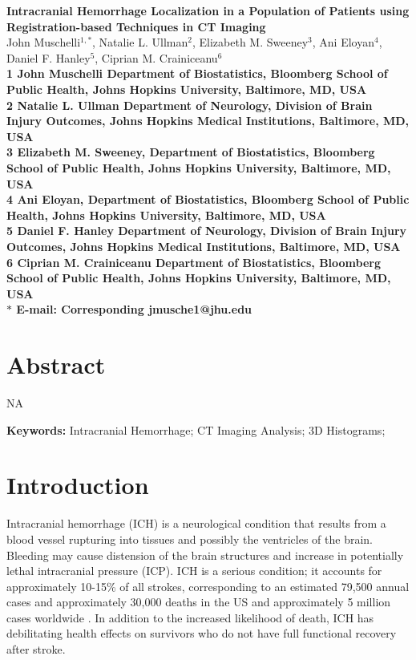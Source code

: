 \documentclass[10pt]{article}\usepackage[]{graphicx}\usepackage[]{color}
\date{}
\begin{document}
\begin{flushleft}
{\Large
\textbf{Intracranial Hemorrhage Localization in a Population of Patients using Registration-based Techniques in CT Imaging}
}
\\
John Muschelli$^{1,\ast}$,  
Natalie L. Ullman$^{2}$,
Elizabeth M. Sweeney$^{3}$,
Ani Eloyan$^{4}$,
Daniel F. Hanley$^{5}$,
Ciprian M. Crainiceanu$^{6}$
\\
\bf{1} John Muschelli Department of Biostatistics, Bloomberg School of Public Health, Johns Hopkins University, Baltimore, MD, USA
\\
\bf{2} Natalie L. Ullman Department of Neurology, Division of Brain Injury Outcomes,  Johns Hopkins Medical Institutions, Baltimore, MD, USA
\\
\bf{3} Elizabeth M. Sweeney, Department of Biostatistics, Bloomberg School of Public Health, Johns Hopkins University, Baltimore, MD, USA
\\
\bf{4} Ani Eloyan, Department of Biostatistics, Bloomberg School of Public Health, Johns Hopkins University, Baltimore, MD, USA
\\
\bf{5} Daniel F. Hanley Department of Neurology, Division of Brain Injury Outcomes,  Johns Hopkins Medical Institutions, Baltimore, MD, USA
\\
\bf{6} Ciprian M. Crainiceanu Department of Biostatistics, Bloomberg School of Public Health, Johns Hopkins University, Baltimore, MD, USA
\\
$\ast$ E-mail: Corresponding jmusche1@jhu.edu
\end{flushleft}


\section*{Abstract}

NA

{\bf Keywords:} Intracranial Hemorrhage; CT Imaging Analysis; 3D Histograms;










\section{Introduction}

Intracranial hemorrhage (ICH) is a neurological condition that results from a blood vessel rupturing into tissues and possibly the ventricles of the brain.  Bleeding may cause distension of the brain structures and increase in potentially lethal intracranial pressure (ICP).  ICH is a serious condition; it accounts for approximately 10-15\% of all strokes, corresponding to an estimated 79,500 annual cases \citep{go_heart_2013} and approximately 30,000 deaths \citep{qureshi_spontaneous_2001} in the US and approximately 5 million cases worldwide \citep{krishnamurthi_global_2014}. In addition to the increased likelihood of death, ICH has debilitating health effects on survivors who do not have full functional recovery after stroke.
\end{document}
